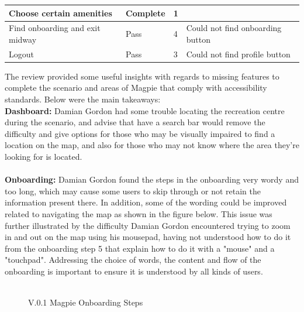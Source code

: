 \begin{table}[h!]
\begin{tabular}{|p{}|p{}|p{}|p{}|}
        \hline
        Choose certain amenities         & Complete        & 1                   &                                                                                   \\
        \hline
        Find onboarding and exit midway  & Pass            & 4                   & Could not find onboarding button                                                  \\
        \hline
        Logout                           & Pass            & 3                   & Could not find profile button                                                     \\
        \hline
    \end{tabular}
\end{table}

The review provided some useful insights with regards to missing features to complete the scenario and areas of Magpie that comply with accessibility standards. Below were the main takeaways:\\
\textbf{Dashboard: }
Damian Gordon had some trouble locating the recreation centre during the scenario, and advise that have a search bar would remove the difficulty and give options for those who may be visually impaired to find a location on the map, and also for those who may not know where the area they're looking for is located.\\\\
\textbf{Onboarding: }
Damian Gordon found the steps in the onboarding very wordy and too long, which may cause some users to skip through or not retain the information present there. In addition, some of the wording could be improved related to navigating the map as shown in the figure below. This issue was further illustrated by the difficulty Damian Gordon encountered trying to zoom in and out on the map using his mousepad, having not understood how to do it from the onboarding step 5 that explain how to do it with a "mouse" and a "touchpad". Addressing the choice of words, the content and flow of the onboarding is important to ensure it is understood by all kinds of users.\\\\
\begin{figure}
    \centering
    \caption{V.0.1 Magpie Onboarding Steps}
\end{figure}
